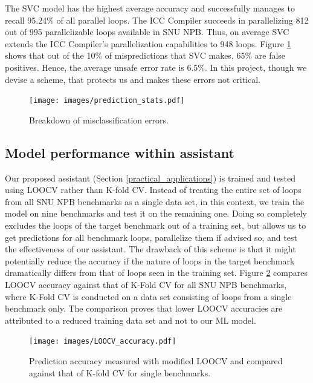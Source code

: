 The SVC model has the highest average accuracy and successfully manages to recall 95.24\% of all parallel loops. The ICC Compiler succeeds in parallelizing 812 out of 995 parallelizable loops available in SNU NPB. Thus, on average SVC extends the ICC Compiler's parallelization capabilities to 948 loops. Figure \ref{fig:prediction_stats} shows that out of the 10\% of mispredictions that SVC makes, 65\% are false positives. Hence, the average unsafe error rate is 6.5\%. In this project, though we devise a scheme, that protects us and makes these errors not critical.
\begin{figure}[ht]
\texttt{[image: images/prediction\_stats.pdf]}
\caption{Breakdown of misclassification errors.}
\label{fig:prediction_stats}
\vspace{-5mm}
\end{figure}
\subsection{Model performance within assistant}
\label{evaluation_loocv}
\quad Our proposed assistant (Section \ref{practical_applications}) is trained and tested using LOOCV rather than K-fold CV. Instead of treating the entire set of loops from all SNU NPB benchmarks as a single data set, in this context, we train the model on nine benchmarks and test it on the remaining one. Doing so completely excludes the loops of the target benchmark out of a training set, but allows us to get predictions for all benchmark loops, parallelize them if advised so, and test the effectiveness of our assistant. The drawback of this scheme is that it might potentially reduce the accuracy if the nature of loops in the target benchmark dramatically differs from that of loops seen in the training set. Figure \ref{fig:accuracy_loocv_vs_kfold} compares LOOCV accuracy against that of K-Fold CV for all SNU NPB benchmarks, where K-Fold CV is conducted on a data set consisting of loops from a single benchmark only. The comparison proves that lower LOOCV accuracies are attributed to a reduced training data set and not to our ML model.
\begin{figure}[ht]
\texttt{[image: images/LOOCV\_accuracy.pdf]}
\caption{Prediction accuracy measured with modified LOOCV and compared against that of K-fold CV for single benchmarks.}
\label{fig:accuracy_loocv_vs_kfold}
\vspace{-5mm}
\end{figure}
